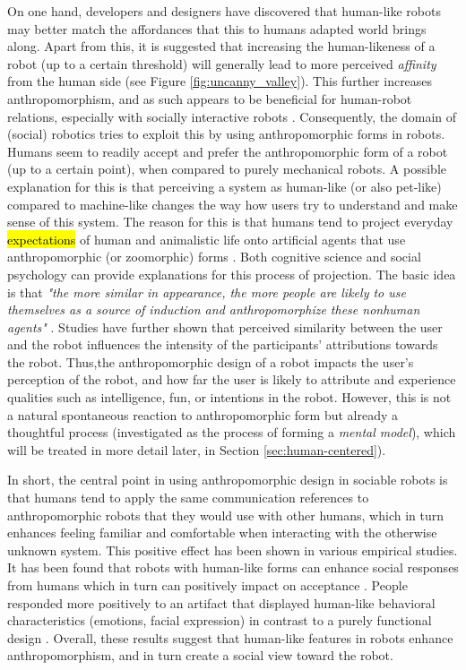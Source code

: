 \documentclass{frontiersSCNS} %
\begin{document}
On one hand, developers and designers have discovered that human-like robots may better 
match the affordances that this to humans adapted world brings along. 
Apart from this, it is suggested that increasing the human-likeness of a robot (up to a 
certain threshold) will generally lead to 
more perceived \textit{affinity} from the human side \citep{mori_uncanny_1970} (see 
Figure \ref{fig:uncanny_valley}).
This further increases anthropomorphism, and as such
appears to be beneficial for human-robot relations, especially with socially 
interactive robots \cite{fong_survey_2003}. Consequently, the domain of (social) 
robotics tries to exploit this by using
anthropomorphic forms in robots.
Humans seem to readily accept and prefer the 
anthropomorphic form of a robot (up to a certain point), when compared to purely mechanical 
robots. A possible explanation for this is that perceiving a system as
human-like (or also pet-like) compared to machine-like changes the 
way how users try to understand and make sense of this system. The reason for this is 
that humans tend to project everyday 
\hl{expectations} of human and animalistic life onto artificial agents that use 
anthropomorphic (or zoomorphic) forms \cite{schmitz_concepts_2011}. 
Both cognitive science 
and social psychology can provide explanations for this process of projection. The basic idea 
is that \textit{"the more similar in 
appearance, the more people are likely to use themselves as a source of induction 
and anthropomorphize these nonhuman agents"} \citep{epley_seeing_2007}. Studies have further 
shown that perceived similarity between the user and the robot influences the intensity of 
the participants' attributions towards the robot. Thus,the anthropomorphic design of a robot 
impacts the user's perception of the robot, and how far the user is likely to attribute and 
experience qualities such as intelligence, fun, or intentions in the robot. However, this is not a natural spontaneous reaction to anthropomorphic form but already a thoughtful process (investigated as the process of forming a \textit{mental model}), which will be treated in more detail later, in Section \ref{sec:human-centered}).

In short, the central point in using anthropomorphic design in sociable robots is that 
humans tend to apply the same communication references to anthropomorphic robots 
that they would use with other humans, which in turn enhances feeling familiar and 
comfortable when interacting with the otherwise unknown system.
This positive effect has been shown in various 
empirical studies. It has been found that robots with human-like forms can enhance social 
responses from humans which in turn can positively impact on acceptance 
\citep{duffy_anthropomorphism_2003,goetz_cooperation_2002,venkatesh_theoretical_2000}. 
People responded more positively to an artifact that displayed human-like 
behavioral characteristics (emotions, facial expression) in contrast to a purely 
functional design 
\citep{eyssel_anthropomorphic_2010,krach_can_2008,reeves_media_1996,riek_how_2009}. 
Overall, these results suggest that human-like features in robots enhance 
anthropomorphism, and in turn create a social view toward the robot.
\end{document}
